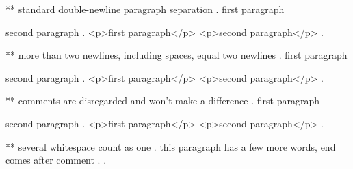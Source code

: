 ** standard double-newline paragraph separation
.
first paragraph

second paragraph
.
<p>first paragraph</p>
<p>second paragraph</p>
.


** more than two newlines, including spaces, equal two newlines
.
first paragraph

   
  


second paragraph
.
<p>first paragraph</p>
<p>second paragraph</p>
.


** comments are disregarded and won't make a difference
.
first paragraph




second paragraph
.
<p>first paragraph</p>
<p>second paragraph</p>
.


** several whitespace count as one
.
   this     paragraph  has a    few more
 words,   end
comes after comment
.
.
